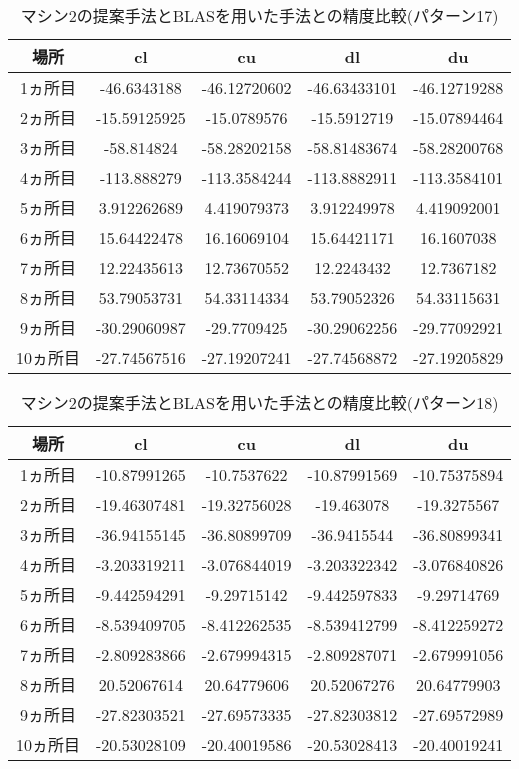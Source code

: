 \documentclass[11pt,a4paper]{jsreport}
\theoremstyle{definition}
\begin{document}
\begin{table}[H]
\centering
\begin{tabular}{|c|c|c|c|c|}
\hline
場所 & cl & cu & dl & du \\ \hline
1ヵ所目 & -46.6343188 & -46.12720602 & -46.63433101 & -46.12719288 \\ \hline
2ヵ所目 & -15.59125925 & -15.0789576 & -15.5912719 & -15.07894464 \\ \hline
3ヵ所目 & -58.814824 & -58.28202158 & -58.81483674 & -58.28200768 \\ \hline
4ヵ所目 & -113.888279 & -113.3584244 & -113.8882911 & -113.3584101 \\ \hline
5ヵ所目 & 3.912262689 & 4.419079373 & 3.912249978 & 4.419092001 \\ \hline
6ヵ所目 & 15.64422478 & 16.16069104 & 15.64421171 & 16.1607038 \\ \hline
7ヵ所目 & 12.22435613 & 12.73670552 & 12.2243432 & 12.7367182 \\ \hline
8ヵ所目 & 53.79053731 & 54.33114334 & 53.79052326 & 54.33115631 \\ \hline
9ヵ所目 & -30.29060987 & -29.7709425 & -30.29062256 & -29.77092921 \\ \hline
10ヵ所目 & -27.74567516 & -27.19207241 & -27.74568872 & -27.19205829 \\ \hline
\end{tabular}
\caption{マシン2の提案手法とBLASを用いた手法との精度比較(パターン17)}
\end{table}

\begin{table}[H]
\centering
\begin{tabular}{|c|c|c|c|c|}
\hline
場所 & cl & cu & dl & du \\ \hline
1ヵ所目 & -10.87991265 & -10.7537622 & -10.87991569 & -10.75375894 \\ \hline
2ヵ所目 & -19.46307481 & -19.32756028 & -19.463078 & -19.3275567 \\ \hline
3ヵ所目 & -36.94155145 & -36.80899709 & -36.9415544 & -36.80899341 \\ \hline
4ヵ所目 & -3.203319211 & -3.076844019 & -3.203322342 & -3.076840826 \\ \hline
5ヵ所目 & -9.442594291 & -9.29715142 & -9.442597833 & -9.29714769 \\ \hline
6ヵ所目 & -8.539409705 & -8.412262535 & -8.539412799 & -8.412259272 \\ \hline
7ヵ所目 & -2.809283866 & -2.679994315 & -2.809287071 & -2.679991056 \\ \hline
8ヵ所目 & 20.52067614 & 20.64779606 & 20.52067276 & 20.64779903 \\ \hline
9ヵ所目 & -27.82303521 & -27.69573335 & -27.82303812 & -27.69572989 \\ \hline
10ヵ所目 & -20.53028109 & -20.40019586 & -20.53028413 & -20.40019241 \\ \hline
\end{tabular}
\caption{マシン2の提案手法とBLASを用いた手法との精度比較(パターン18)}
\end{table}
\end{document}
